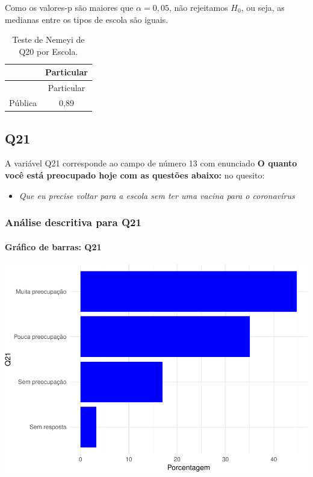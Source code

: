 \documentclass[]{article}
\providecommand{\tightlist}{%
  \setlength{\itemsep}{0pt}\setlength{\parskip}{0pt}}
\let\oldparagraph\paragraph
\renewcommand{\paragraph}[1]{\oldparagraph{#1}\mbox{}}
\begin{document}
Como os valores-p são maiores que \(\alpha=0,05\), não rejeitamos \(H_0\), ou seja, as medianas entre os tipos de escola são iguais.

\begin{longtable}[]{@{}lc@{}}
\caption{\label{tab:unnamed-chunk-322}Teste de Nemeyi de Q20 por Escola.}\tabularnewline
\toprule
& Particular\tabularnewline
\midrule
\endfirsthead
\toprule
& Particular\tabularnewline
\midrule
\endhead
Pública & 0,89\tabularnewline
\bottomrule
\end{longtable}

\cleardoublepage

\hypertarget{q21}{%
\subsection{Q21}\label{q21}}

A variável Q21 corresponde ao campo de número 13 com enunciado \textbf{O quanto você está preocupado hoje com as questões abaixo:} no quesito:

\begin{itemize}
\tightlist
\item
  \emph{Que eu precise voltar para a escola sem ter uma vacina para o coronavírus}
\end{itemize}

\hypertarget{anuxe1lise-descritiva-para-q21}{%
\subsubsection{Análise descritiva para Q21}\label{anuxe1lise-descritiva-para-q21}}

\hypertarget{gruxe1fico-de-barras-q21}{%
\paragraph{Gráfico de barras: Q21}\label{gruxe1fico-de-barras-q21}}

\begin{center}\includegraphics[width=0.75\linewidth]{relatorio_files/figure-latex/unnamed-chunk-323-1} \end{center}
\end{document}

